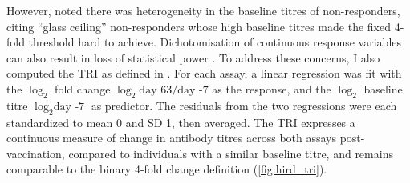 However, \autocite{sobolev2016AdjuvantedInfluenzaH1N1Vaccination} noted there was heterogeneity in the baseline titres of non-responders, citing \enquote{glass ceiling} non-responders whose high baseline titres made the fixed 4-fold threshold hard to achieve.
Dichotomisation of continuous response variables can also result in loss of statistical power \autocite{cohen1983CostDichotomization, fedorov2009ConsequencesDichotomization}.
To address these concerns, I also computed the \gls{TRI} as defined in \textcite{bucasas2011EarlyPatternsGene}.
For each assay, a linear regression was fit with the $\log_2$ fold change $\log_2{\text{day 63}/\text{day -7}}$ as the response, and the $\log_2$ baseline titre $\log_2{\text{day -7}}$ as predictor.
The residuals from the two regressions were each standardized to mean 0 and \gls{SD} 1, then averaged.
The \gls{TRI} expresses a continuous measure of change in antibody titres across both assays post-vaccination, compared to individuals with a similar baseline titre, and remains comparable to the binary 4-fold change definition (\autoref{fig:hird_tri}).


